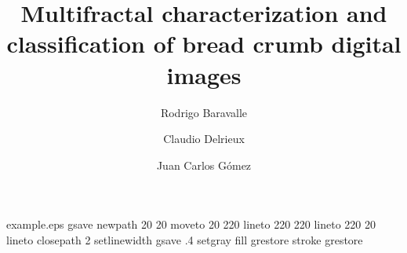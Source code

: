 %
%
%
%
%
\begin{filecontents*}{example.eps}
gsave
newpath
  20 20 moveto
  20 220 lineto
  220 220 lineto
  220 20 lineto
closepath
2 setlinewidth
gsave
  .4 setgray fill
grestore
stroke
grestore
\end{filecontents*}
%
\RequirePackage{fix-cm}
%
\documentclass[twocolumn]{svjour3}          %
%
\smartqed  %
%
\usepackage{graphicx}
\usepackage{amssymb}
%
\usepackage{mathptmx}      %
%
%
%
%


\title{Multifractal characterization and classification of bread crumb digital images%
}


\author{Rodrigo Baravalle         \and
        Claudio Delrieux \and
        Juan Carlos G\'omez
}


